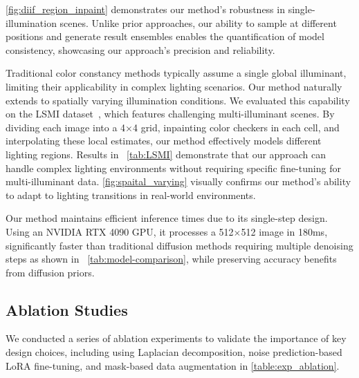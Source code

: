 \vspace{3pt}  
\cref{fig:diif_region_inpaint} demonstrates our method's robustness in single-illumination scenes. Unlike prior approaches, our ability to sample at different positions and generate result ensembles enables the quantification of model consistency, showcasing our approach's precision and reliability.

\vspace{3pt}  
Traditional color constancy methods typically assume a single global illuminant, limiting their applicability in complex lighting scenarios. Our method naturally extends to spatially varying illumination conditions. We evaluated this capability on the LSMI dataset~\cite{kim2021large}, which features challenging multi-illuminant scenes. By dividing each image into a 4$\times$4 grid, inpainting color checkers in each cell, and interpolating these local estimates, our method effectively models different lighting regions. Results in ~\cref{tab:LSMI} demonstrate that our approach can handle complex lighting environments without requiring specific fine-tuning for multi-illuminant data. \cref{fig:spaital_varying} visually confirms our method's ability to adapt to lighting transitions in real-world environments.

\vspace{3pt}  
Our method maintains efficient inference times due to its single-step design. Using an NVIDIA RTX 4090 GPU, it processes a 512$\times$512 image in 180ms, significantly faster than traditional diffusion methods requiring multiple denoising steps as shown in ~\cref{tab:model-comparison}, while preserving accuracy benefits from diffusion priors.











\subsection{Ablation Studies}
We conducted a series of ablation experiments to validate the importance of key design choices, including using Laplacian decomposition, noise prediction-based LoRA fine-tuning, and mask-based data augmentation in \cref{table:exp_ablation}.

